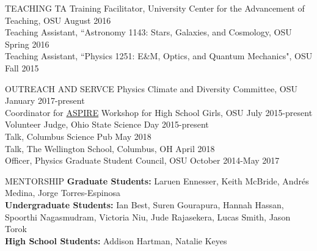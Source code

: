 \documentclass{resume} %
\begin{document}
\begin{rSection}{TEACHING}
TA Training Facilitator, University Center for the Advancement of Teaching, OSU \hfill {August 2016}\\
Teaching Assistant, ``Astronomy 1143: Stars, Galaxies, and Cosmology, OSU \hfill {Spring 2016}\\
Teaching Assistant, ``Physics 1251: E\&M, Optics, and Quantum Mechanics", OSU \hfill {Fall 2015}\\
\end{rSection}
\vspace{-0.35cm}
\begin{rSection}{OUTREACH AND SERVCE}
Physics Climate and Diversity Committee, OSU \hfill January 2017-present\\
Coordinator for \href{u.osu.edu/aspire}{ASPIRE} Workshop for High School Girls, OSU \hfill July 2015-present\\
Volunteer Judge, Ohio State Science Day \hfill 2015-present\\
Talk, Columbus Science Pub \hfill  May 2018\\
Talk, The Wellington School, Columbus, OH \hfill April 2018\\
Officer, Physics Graduate Student Council, OSU \hfill October 2014-May 2017 \\
\end{rSection}
\vspace{-0.30cm}

\newpage
\begin{rSection}{MENTORSHIP}
{\bf Graduate Students:} Laruen Ennesser, Keith McBride, Andr\'es Medina, Jorge Torres-Espinosa\\
{\bf Undergraduate Students:}  Ian Best, Suren Gourapura, Hannah Hassan, Spoorthi Nagasmudram, Victoria Niu, Jude Rajasekera, Lucas Smith, Jason Torok \\
{\bf High School Students:} Addison Hartman, Natalie Keyes\\
\end{rSection}
\end{document}
